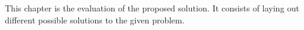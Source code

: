 This chapter is the evaluation of the proposed solution. It consists of laying out different possible solutions to the given problem.
